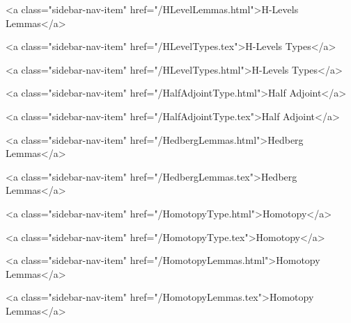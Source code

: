       
        
          <a class="sidebar-nav-item" href="/HLevelLemmas.html">H-Levels Lemmas</a>
        
      
    
      
        
          <a class="sidebar-nav-item" href="/HLevelTypes.tex">H-Levels Types</a>
        
      
    
      
        
          <a class="sidebar-nav-item" href="/HLevelTypes.html">H-Levels Types</a>
        
      
    
      
        
          <a class="sidebar-nav-item" href="/HalfAdjointType.html">Half Adjoint</a>
        
      
    
      
        
          <a class="sidebar-nav-item" href="/HalfAdjointType.tex">Half Adjoint</a>
        
      
    
      
        
          <a class="sidebar-nav-item" href="/HedbergLemmas.html">Hedberg Lemmas</a>
        
      
    
      
        
          <a class="sidebar-nav-item" href="/HedbergLemmas.tex">Hedberg Lemmas</a>
        
      
    
      
        
          <a class="sidebar-nav-item" href="/HomotopyType.html">Homotopy</a>
        
      
    
      
        
          <a class="sidebar-nav-item" href="/HomotopyType.tex">Homotopy</a>
        
      
    
      
        
          <a class="sidebar-nav-item" href="/HomotopyLemmas.html">Homotopy Lemmas</a>
        
      
    
      
        
          <a class="sidebar-nav-item" href="/HomotopyLemmas.tex">Homotopy Lemmas</a>
        
      
    
